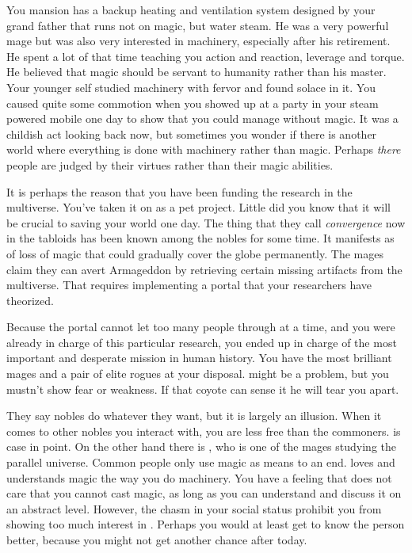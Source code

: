 \documentclass[char]{guildcamp3}
\begin{document}
You mansion has a backup heating and ventilation system designed by your grand father that runs not on magic, but water steam. He was a very powerful mage but was also very interested in machinery, especially after his retirement. He spent a lot of that time teaching you action and reaction, leverage and torque. He believed that magic should be servant to humanity rather than his master. Your younger self studied machinery with fervor and found solace in it. You caused quite some commotion when you showed up at a party in your steam powered mobile one day to show that you could manage without magic. It was a childish act looking back now, but sometimes you wonder if there is another world where everything is done with machinery rather than magic. Perhaps \emph{there} people are judged by their virtues rather than their magic abilities.

It is perhaps the reason that you have been funding the research in the multiverse. You've taken it on as a pet project. Little did you know that it will be crucial to saving your world one day. The thing that they call \emph{convergence} now in the tabloids has been known among the nobles for some time. It manifests as of loss of magic that could gradually cover the globe permanently. The mages claim they can avert Armageddon by retrieving certain missing artifacts from the multiverse. That requires implementing a portal that your researchers have theorized. 

Because the portal cannot let too many people through at a time, and you were already in charge of this particular research, you ended up in charge of the most important and desperate mission in human history. You have the most brilliant mages and a pair of elite rogues at your disposal. \cNobleTwo{} might be a problem, but you mustn't show fear or weakness. If that coyote can sense it he will tear you apart. 

They say nobles do whatever they want, but it is largely an illusion. When it comes to other nobles you interact with, you are less free than the commoners. \cNobleTwo{} is case in point. On the other hand there is \cMageOne{\intro}, who is one of the mages studying the parallel universe. Common people only use magic as means to an end. \cMageOne{} loves and understands magic the way you do machinery. You have a feeling that  does not care that you cannot cast magic, as long as you can understand and discuss it on an abstract level. However, the chasm in your social status prohibit you from showing too much interest in \cMageOne{}. Perhaps you would at least get to know the person better, because you might not get another chance after today.
\end{document}
